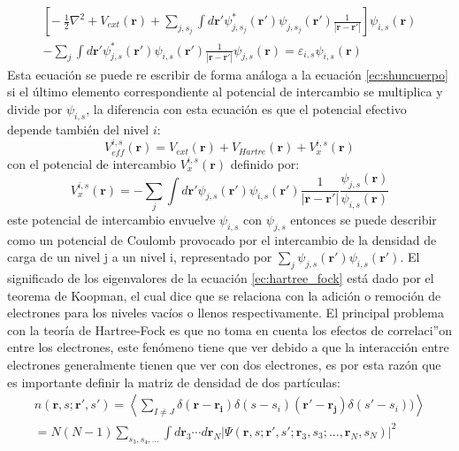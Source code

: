 \documentclass[12pt,a4paper, oneside]{book}
\begin{document}
  \begin{multline}
  \left[ -~\frac{1}{2} \nabla^2+ V_{ext} (\pmb{r})+ \sum_{j,s_j} \int d \pmb{r'} \psi_{j,s_j}^* (\pmb{r'}) \psi_{j,s_j} (\pmb{r'}) \frac{1}{|\pmb{r} - \pmb{r'}|}  \right] \psi_{i,s} (\pmb{r}) \\
  - \sum_{j} \int d \pmb{r'} \psi_{j,s}^* (\pmb{r'}) \psi_{i,s} (\pmb{r'}) \frac{1}{|\pmb{r} - \pmb{r'}|} \psi_{j,s} (\pmb{r}) = \varepsilon_{i,s} \psi_{i,s} (\pmb{r}) \label{ec:hartree_fock}
  \end{multline} 
  Esta ecuaci\'on se puede re escribir de forma an\'aloga a la ecuaci\'on \ref{ec:shuncuerpo} si el \'ultimo elemento correspondiente al potencial de intercambio se multiplica y divide por $\psi_{i,s } $, la diferencia con esta ecuaci\'on es que el potencial efectivo depende tambi\'en del nivel $i$:
  \begin{equation}
  V_{eff}^{i,s}(\pmb{r}) =V_{ext}(\pmb{r})+ V_{Hartre} (\pmb{r}) + V_{x}^{i,s} (\pmb{r}) \label{ec:poteff}
  \end{equation}
  con el potencial de intercambio $ V_{x}^{i,s} (\pmb{r}) $ definido por:
  \begin{equation}
  V_{x}^{i,s} (\pmb{r}) = - \sum_{j} \int d \pmb{r'} \psi_{j,s} (\pmb{r'}) \psi_{i,s} (\pmb{r'}) \frac{1}{|\pmb{r}- \pmb{r'}|} \frac{\psi_{j,s} (\pmb{r})}{\psi_{i,s} (\pmb{r})} \label{ec:vx}
  \end{equation}
  este potencial de intercambio envuelve $\psi_{i,s}$ con $\psi_{j,s}$ entonces se puede describir como un potencial  de Coulomb provocado por el intercambio de la densidad de carga de un nivel j a un nivel i, representado por $ \sum_{j} \psi_{j,s} (\pmb{r'}) \psi_{i,s} (\pmb{r'}) $.
  \newline
  El significado de los eigenvalores de la ecuaci\'on \ref{ec:hartree_fock} est\'a dado por el teorema de Koopman, el cual dice que se relaciona con la adici\'on o remoci\'on  de electrones para los niveles vac\'ios o llenos respectivamente.
  \newline \newline
  El principal problema con la teor\'ia de Hartree-Fock es que no toma en cuenta los efectos de correlaci''on entre los electrones, este fen\'omeno tiene que ver debido a que la interacci\'on entre electrones generalmente tienen que ver con dos electrones, es por esta raz\'on que es importante definir la matriz de densidad   de dos part\'iculas:
  \begin{multline}
  n(\pmb{r},s; \pmb{r'},s' )= \left\langle \sum_{I \not= J} \delta (\pmb{r}- \pmb{r_i}) \delta (s-s_i) (\pmb{r'}- \pmb{r_j}) \delta (s'-s_i) )  \right\rangle \\
  = N(N-1) \sum_{s_3,s_4,...} \int d \pmb{r}_3 \cdots d \pmb{r}_N |\Psi (\pmb{r},s; \pmb{r'},s'; \pmb{r}_3,s_3; ..., \pmb{r}_N,s_N)|^2   \label{ec:joindensity}
  \end{multline}
\end{document}
